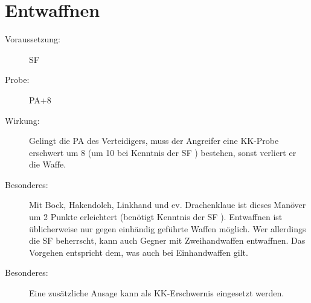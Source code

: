 \section{Entwaffnen}
\label{reaktion.entwaffnen}
\begin{description}
    \item[Voraussetzung:]
        SF 
    \item[Probe:]
        PA+8
    \item[Wirkung:]
        Gelingt die PA des Verteidigers, muss der Angreifer eine KK-Probe erschwert um 8 (um 10 bei Kenntnis der SF ) bestehen, sonst verliert er die Waffe.
    \item[Besonderes:]
        Mit Bock, Hakendolch, Linkhand und ev. Drachenklaue ist dieses Manöver um 2 Punkte erleichtert (benötigt Kenntnis der SF ).
        Entwaffnen ist üblicherweise nur gegen einhändig geführte Waffen möglich.
        Wer allerdings die SF  beherrscht, kann auch Gegner mit Zweihandwaffen entwaffnen.
        Das Vorgehen entspricht dem, was auch bei Einhandwaffen gilt.
    \item[Besonderes:]
        Eine zusätzliche Ansage kann als KK-Erschwernis eingesetzt werden.
\end{description}
